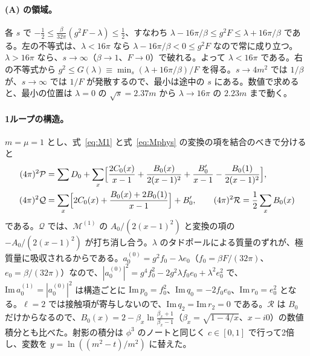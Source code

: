 \documentclass[a4paper,10pt]{ltjsarticle}
\begin{document}
\paragraph{(A) の領域。}各 $s$ で $-\frac12\le\frac{\beta}{32\pi}(g^2F-\lambda)\le\frac12$、すなわち $\lambda-16\pi/\beta\le g^2F\le\lambda+16\pi/\beta$ である。左の不等式は、$\lambda<16\pi$ なら $\lambda-16\pi/\beta<0\le g^2F$ なので常に成り立つ。$\lambda>16\pi$ なら、$s\to\infty$（$\beta\to1$、$F\to0$）で破れる。よって $\lambda<16\pi$ である。右の不等式から $g^2\le G(\lambda)\equiv\min_s(\lambda+16\pi/\beta)/F$ を得る。$s\to4m^2$ では $1/\beta$ が、$s\to\infty$ では $1/F$ が発散するので、最小は途中の $s$ にある。数値で求めると、最小の位置は $\lambda=0$ の $\sqrt s=2.37m$ から $\lambda\to16\pi$ の $2.23m$ まで動く。

\paragraph{1ループの構造。}$m=\mu=1$ とし、式~\eqref{eq:M1} と式~\eqref{eq:Mphys} の変換の項を結合のべきで分けると
\begin{equation*}
\begin{aligned}
(4\pi)^2\mathcal{P}&=\sum D_0+\sum_x\Bigl[\frac{2C_0(x)}{x-1}+\frac{B_0(x)}{2(x-1)^2}+\frac{B_0'}{x-1}-\frac{B_0(1)}{2(x-1)^2}\Bigr],\\
(4\pi)^2\mathcal{Q}&=\sum_x\Bigl[2C_0(x)+\frac{B_0(x)+2B_0(1)}{x-1}\Bigr]+B_0',\qquad
(4\pi)^2\mathcal{R}=\frac12\sum_xB_0(x)
\end{aligned}
\end{equation*}
である。$\mathcal{Q}$ では、$\mathcal{M}^{(1)}$ の $A_0/(2(x-1)^2)$ と変換の項の $-A_0/(2(x-1)^2)$ が打ち消し合う。$\lambda$ のタドポールによる質量のずれが、極質量に吸収されるからである。$a_0^{(0)}=g^2f_0-\lambda e_0$（$f_0=\beta F/(32\pi)$、$e_0=\beta/(32\pi)$）なので、$|a_0^{(0)}|^2=g^4f_0^2-2g^2\lambda f_0e_0+\lambda^2e_0^2$ で、$\mathrm{Im}\,a_0^{(1)}=|a_0^{(0)}|^2$ は構造ごとに $\mathrm{Im}\,p_0=f_0^2$、$\mathrm{Im}\,q_0=-2f_0e_0$、$\mathrm{Im}\,r_0=e_0^2$ となる。$\ell=2$ では接触項が寄与しないので、$\mathrm{Im}\,q_2=\mathrm{Im}\,r_2=0$ である。$\mathcal{R}$ は $B_0$ だけからなるので、$B_0(x)=2-\beta_x\ln\frac{\beta_x+1}{\beta_x-1}$（$\beta_x=\sqrt{1-4/x}$、$x-i0$）の数値積分とも比べた。射影の積分は $\phi^3$ のノートと同じく $c\in[0,1]$ で行って2倍し、変数を $y=\ln((m^2-t)/m^2)$ に替えた。
\end{document}
